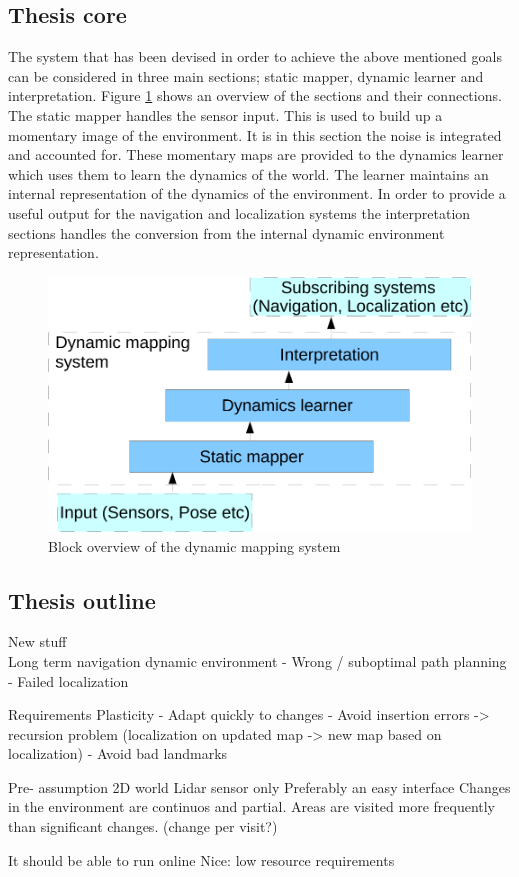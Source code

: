\subsection{Thesis core}
The system that has been devised in order to achieve the above mentioned goals can be considered in three main sections; static mapper, dynamic learner and interpretation. 
Figure \ref{fig:block-overview} shows an overview of the sections and their connections. 
The static mapper handles the sensor input. This is used to build up a momentary image of the environment. It is in this section the noise is integrated and accounted for. 
These momentary maps are provided to the dynamics learner which uses them to learn the dynamics of the world. 
The learner maintains an internal representation of the dynamics of the environment. 
In order to provide a useful output for the navigation and localization systems the interpretation sections handles the conversion from the internal dynamic environment representation. 

\begin{figure} [htbp]
	\centering
	\includegraphics[scale=0.7]{chapters/introduction/figures/system-overview}
	\caption{Block overview of the dynamic mapping system}
	\label{fig:block-overview}
\end{figure}

\subsection{Thesis outline}

New stuff\\
Long term navigation dynamic environment
- Wrong / suboptimal path planning
- Failed localization

Requirements
Plasticity
- Adapt quickly to changes 
- Avoid insertion errors -> recursion problem (localization on updated map -> new map based on localization)
- Avoid bad landmarks

Pre- assumption
2D world
Lidar sensor only
Preferably an easy interface 
Changes in the environment are continuos and partial. Areas are visited more frequently than significant changes. (change per visit?)

It should be able to run online
Nice: low resource requirements




